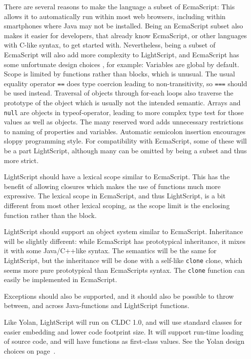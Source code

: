 \documentclass[11pt]{report}
\begin{document}
There are several reasons to make the language a subset of EcmaScript:
This allows it to automatically run within most web browsers, including within smartphones where Java may not be installed.
Being an EcmaScript subset also makes it easier for developers, that already know EcmaScript, or other languages with C-like syntax, to get started with.
Nevertheless, being a subset of EcmaScript will also add more complexity to LightScript, and EcmaScript has some unfortunate design choices \cite{crockford-web}, for example: 
Variables are global by default.
Scope is limited by functions rather than blocks, which is unusual.
The usual equality operator \verb|==| does type coercion leading to non-transitivity, so \verb|===| should be used instead.
Traversal of objects through for-each loops also traverse the prototype of the object which is usually not the intended semantic.
Arrays and \verb|null| are objects in typeof-operator, leading to more complex type test for those values as well as objects.
The many reserved word adds unnecessary restrictions to naming of properties and variables.
Automatic semicolon insertion encourages sloppy programming style.
For compatibility with EcmaScript, some of these will be a part LightScript,
although many can be omitted by being a subset and thus more strict. 

LightScript should have a lexical scope similar to EcmaScript.
This has the benefit of allowing closures which makes the use of functions much more expressive.
The lexical scope in EcmaScript, and thus LightScript, is a bit different from most other lexical scoping, as the scope limit is the enclosing function rather than the block.

LightScript should support an object system similar to EcmaScript.
Inheritance will be slightly different: while EcmaScript has prototypical inheritance, it mixes it with some Java/C++like syntax. The semantics will be the same for LightScript, but the inheritance will be done with a self-like \verb|clone| clone, which seems more pure prototypical than EcmaScripts syntax. The \verb|clone| function can easily be implemented in EcmaScript.

Exceptions should also be supported, and it should also be possible to throw between, and across Java-functions and LightScript functions.


Like Yolan, LightScript will run on CLDC 1.0, and will use standard classes for easier embedding and lower code footprint size. It will support run-time loading of source code, and will have functions as first-class values. See the Yolan design choices on page~\pageref{yolandesign}.
\end{document}
